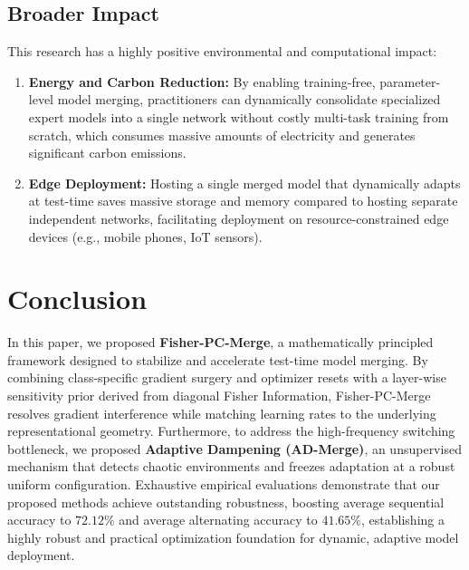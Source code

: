 \documentclass{article}
\theoremstyle{plain}
\theoremstyle{definition}
\theoremstyle{remark}
\begin{document}
\subsection{Broader Impact}
This research has a highly positive environmental and computational impact:
\begin{enumerate}
    \item \textbf{Energy and Carbon Reduction:} By enabling training-free, parameter-level model merging, practitioners can dynamically consolidate specialized expert models into a single network without costly multi-task training from scratch, which consumes massive amounts of electricity and generates significant carbon emissions.
    \item \textbf{Edge Deployment:} Hosting a single merged model that dynamically adapts at test-time saves massive storage and memory compared to hosting separate independent networks, facilitating deployment on resource-constrained edge devices (e.g., mobile phones, IoT sensors).
\end{enumerate}

\section{Conclusion}
\label{conclusion}
In this paper, we proposed \textbf{Fisher-PC-Merge}, a mathematically principled framework designed to stabilize and accelerate test-time model merging. By combining class-specific gradient surgery and optimizer resets with a layer-wise sensitivity prior derived from diagonal Fisher Information, Fisher-PC-Merge resolves gradient interference while matching learning rates to the underlying representational geometry. Furthermore, to address the high-frequency switching bottleneck, we proposed \textbf{Adaptive Dampening (AD-Merge)}, an unsupervised mechanism that detects chaotic environments and freezes adaptation at a robust uniform configuration. Exhaustive empirical evaluations demonstrate that our proposed methods achieve outstanding robustness, boosting average sequential accuracy to \textbf{$72.12\%$} and average alternating accuracy to \textbf{$41.65\%$}, establishing a highly robust and practical optimization foundation for dynamic, adaptive model deployment.




\newpage
\appendix
\onecolumn
\end{document}
